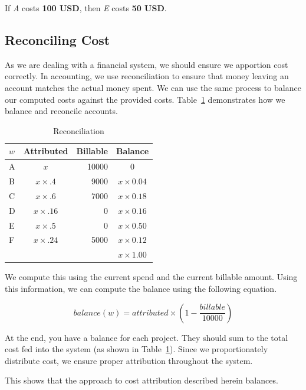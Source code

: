 \documentclass[10pt, a4paper, twocolumn]{article}
\begin{document}
      If \textit{A} costs \textbf{100 USD}, then \textit{E} costs \textbf{50 USD}.

  \subsection*{Reconciling Cost}
    As we are dealing with a financial system, we should ensure we apportion cost correctly.
    In accounting, we use reconciliation to ensure that money leaving an account matches the actual money spent.
    We can use the same process to balance our computed costs against the provided costs.
    Table~\ref{table:1} demonstrates how we balance and reconcile accounts.

    \begin{table}[H]
      \centering
      \begin{tabular}{ l|c|r|c }
        $w$ & Attributed       & Billable & Balance \\
        \hline
        A   & $ x            $ &    10000 & $ 0 $ \\
        B   & $ x \times .4  $ &     9000 & $ x \times 0.04 $ \\
        C   & $ x \times .6  $ &     7000 & $ x \times 0.18 $ \\
        D   & $ x \times .16 $ &        0 & $ x \times 0.16 $ \\
        E   & $ x \times .5  $ &        0 & $ x \times 0.50 $ \\
        F   & $ x \times .24 $ &     5000 & $ x \times 0.12 $ \\
        \hline
            &                  &          & $ x \times 1.00 $ \\
      \end{tabular}
      \caption{Reconciliation}
      \label{table:1}
    \end{table}

    We compute this using the current spend and the current billable amount.
    Using this information, we can compute the balance using the following equation.

    \[ balance(w) = attributed \times \left(1 - \frac{billable}{10000}\right) \]

    At the end, you have a balance for each project.
    They should sum to the total cost fed into the system (as shown in Table~\ref{table:1}).
    Since we proportionately distribute cost, we ensure proper attribution throughout the system.

    This shows that the approach to cost attribution described herein balances.
\end{document}
